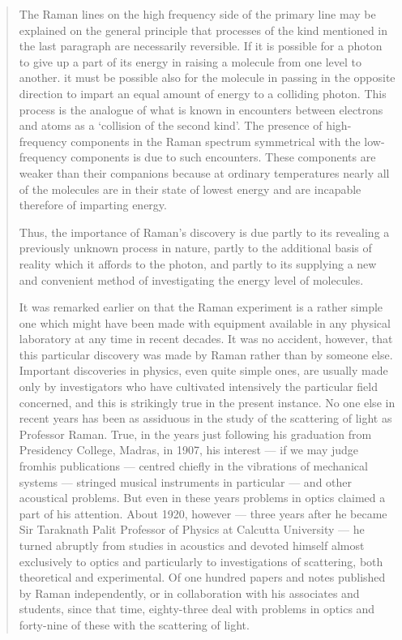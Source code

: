 \begin{quote}
{The Raman lines on the high frequency side of the primary line may be explained on the general principle that processes of the kind mentioned in the last paragraph are necessarily reversible. If it is possible for a photon to give up a part of its energy in raising a molecule from one level to another. it must be possible also for the molecule in passing in the opposite direction to impart an equal amount of energy to a colliding photon. This process is the analogue of what is known in encounters between electrons and atoms as a `collision of the second kind'. The presence of high-frequency components in the Raman spectrum symmetrical with the low-frequency components is due to such encounters. These components are weaker than their companions because at ordinary temperatures nearly all of the molecules are in their state of lowest energy and are incapable therefore of imparting energy.

Thus, the importance of Raman's discovery is due partly to its revealing a previously unknown process in nature, partly to the additional basis of reality which it affords to the photon, and partly to its supplying a new and convenient method of investigating the energy level of molecules.

It was remarked earlier on that the Raman experiment is a rather simple one which might have been made with equipment available in any physical laboratory at any time in recent decades. It was no accident, however, that this particular discovery was made by Raman rather than by someone else. Important discoveries in physics, even quite simple ones, are usually made only by investigators who have cultivated intensively the particular field concerned, and this is strikingly true in the present instance. No one else in recent years has been as assiduous in the study of the scattering of light as Professor \hbox{Raman}. True, in the years just following his graduation from Presidency College, Madras, in 1907, his interest --- if we may judge from\break his publications --- centred chiefly in the vibrations of mechanical systems --- stringed musical instruments in particular --- and other acoustical problems. But even in these years problems in optics claimed a part of his attention. About 1920, however --- three years after he became Sir Taraknath Palit Professor of Physics at Calcutta University --- he turned abruptly from studies in acoustics and devoted himself almost exclusively to optics and particularly to investigations of scattering, both theoretical and experimental. Of one hundred papers and notes published by Raman independently, or in collaboration with his associates and students, since that time, eighty-three deal with problems in optics and forty-nine of these with the scattering of light.

}
\end{quote}
